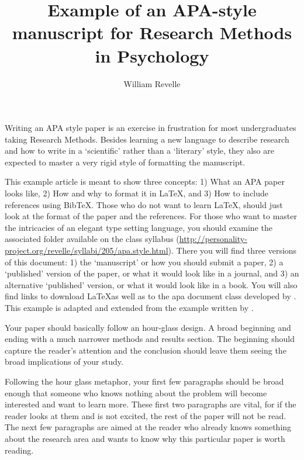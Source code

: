 \documentclass[jou]{apa}%
\title{Example of an APA-style manuscript for Research Methods in Psychology}
\author{William Revelle}
\affiliation{Department of Psychology \\ Northwestern University}
\begin{document}
\maketitle   
Writing an APA style paper is an exercise in frustration for most undergraduates taking Research Methods.  Besides learning a new language to describe research and how to write in a `scientific' rather than a `literary' style, they also are expected to master a very rigid style of formatting the manuscript.  

This example article is meant to show three concepts: 1) What an APA paper looks like, 2) How and why to  format it in \LaTeX, and 3) How to include references using Bib\TeX.  Those who do not want to learn \LaTeX, should just  look at the format of the paper and the references.  For those who want to master the intricacies of an elegant type setting language, you should examine the associated folder available on the class syllabus (\url{http://personality-project.org/revelle/syllabi/205/apa.style.html}).   There you will find three versions of this document: 1)  the `manuscript' or how you should submit a paper,  2) a `published' version of the paper, or what it would look like in a journal, and 3) an alternative `published' version, or what it would look like in a book. You will also find links to download \LaTeX as well as to the apa document class developed by . This example is adapted and extended from the example written by  .  

Your paper should basically follow an hour-glass design.  A broad beginning and ending with a much narrower methods and results section.  The beginning should capture the reader's attention and the conclusion should leave them seeing the broad implications of your study.  

Following the hour glass metaphor, your first few paragraphs should be broad enough that someone who knows nothing about the problem will become interested and want to learn more. These first two paragraphs are vital, for if the reader looks at them and is not excited, the rest of the paper will not be read. The next few paragraphs are aimed at the reader who already knows something about the research area and wants to know why this particular paper is worth reading.  



          
\end{document}
